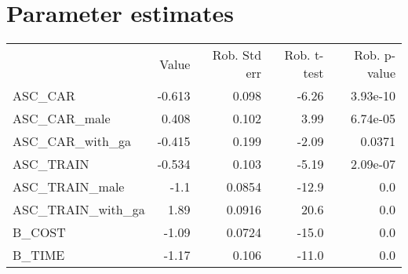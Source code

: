 \section{Parameter estimates}
\begin{tabular}{lrrrr}
 & Value & Rob. Std err & Rob. t-test & Rob. p-value \\
ASC_CAR & -0.613 & 0.098 & -6.26 & 3.93e-10 \\
ASC_CAR_male & 0.408 & 0.102 & 3.99 & 6.74e-05 \\
ASC_CAR_with_ga & -0.415 & 0.199 & -2.09 & 0.0371 \\
ASC_TRAIN & -0.534 & 0.103 & -5.19 & 2.09e-07 \\
ASC_TRAIN_male & -1.1 & 0.0854 & -12.9 & 0.0 \\
ASC_TRAIN_with_ga & 1.89 & 0.0916 & 20.6 & 0.0 \\
B_COST & -1.09 & 0.0724 & -15.0 & 0.0 \\
B_TIME & -1.17 & 0.106 & -11.0 & 0.0 \\
\end{tabular}

